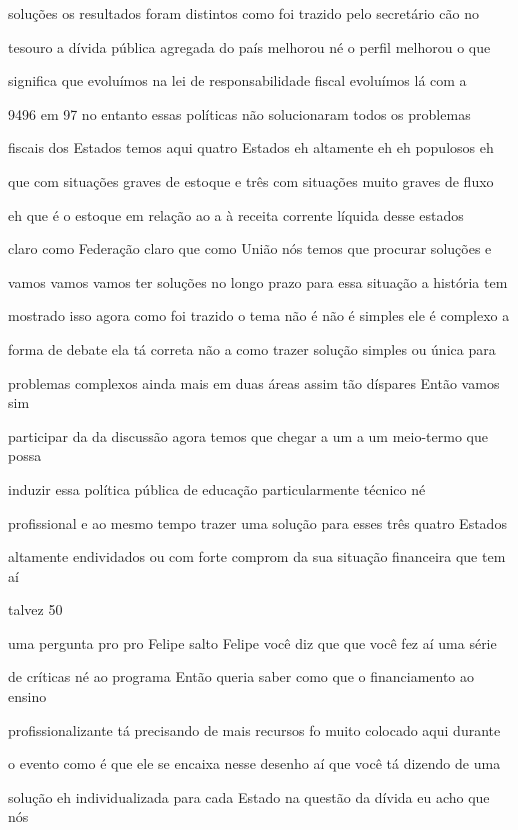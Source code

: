 \documentclass[a4paper,12pt]{article}
\begin{document}
soluções os resultados foram distintos como foi trazido pelo secretário cão no

tesouro a dívida pública agregada do país melhorou né o perfil melhorou o que

significa que evoluímos na lei de responsabilidade fiscal evoluímos lá com a

9496 em 97 no entanto essas políticas não solucionaram todos os problemas

fiscais dos Estados temos aqui quatro Estados eh altamente eh eh populosos eh

que com situações graves de estoque e três com situações muito graves de fluxo

eh que é o estoque em relação ao a à receita corrente líquida desse estados

claro como Federação claro que como União nós temos que procurar soluções e

vamos vamos vamos ter soluções no longo prazo para essa situação a história tem

mostrado isso agora como foi trazido o tema não é não é simples ele é complexo a

forma de debate ela tá correta não a como trazer solução simples ou única para

problemas complexos ainda mais em duas áreas assim tão díspares Então vamos sim

participar da da discussão agora temos que chegar a um a um meio-termo que possa

induzir essa política pública de educação particularmente técnico né

profissional e ao mesmo tempo trazer uma solução para esses três quatro Estados

altamente endividados ou com forte comprom da sua situação financeira que tem aí

talvez 50%

uma pergunta pro pro Felipe salto Felipe você diz que que você fez aí uma série

de críticas né ao programa Então queria saber como que o financiamento ao ensino

profissionalizante tá precisando de mais recursos fo muito colocado aqui durante

o evento como é que ele se encaixa nesse desenho aí que você tá dizendo de uma

solução eh individualizada para cada Estado na questão da dívida eu acho que nós
\end{document}
